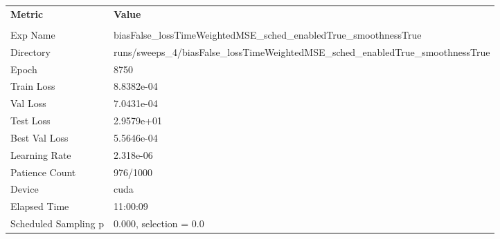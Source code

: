 \begin{tabular}{|l|l|}
\hline
\textbf{Metric} & \textbf{Value} \\\\
Exp Name & biasFalse_lossTimeWeightedMSE_sched_enabledTrue_smoothnessTrue \\ 
Directory & runs/sweeps_4/biasFalse_lossTimeWeightedMSE_sched_enabledTrue_smoothnessTrue \\ 
Epoch & 8750 \\ 
Train Loss & 8.8382e-04 \\ 
Val Loss & 7.0431e-04 \\ 
Test Loss & 2.9579e+01 \\ 
Best Val Loss & 5.5646e-04 \\ 
Learning Rate & 2.318e-06 \\ 
Patience Count & 976/1000 \\ 
Device & cuda \\ 
Elapsed Time & 11:00:09 \\ 
Scheduled Sampling p & 0.000, selection = 0.0 \\ 
\hline
\end{tabular}